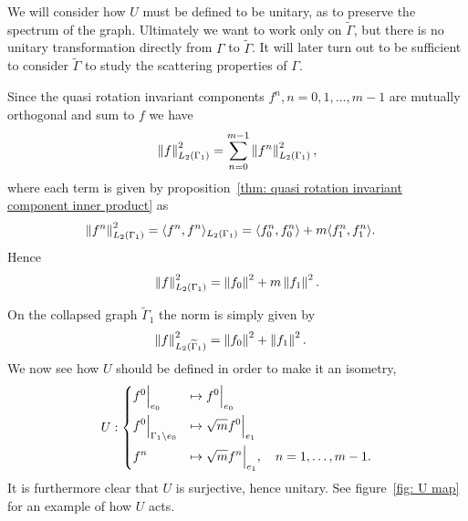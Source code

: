 We will consider how $U$ must be defined to be unitary, as to preserve the spectrum of the graph. Ultimately we want to work only on $\widetilde{\Gamma}$, but there is no unitary transformation directly from $\Gamma$ to $\widetilde{\Gamma}$. It will later turn out to be sufficient to consider $\widetilde{\Gamma}$ to study the scattering properties of $\Gamma$.

Since the quasi rotation invariant components $f^n, n = 0, 1, \ldots, m-1$ are mutually orthogonal and sum to $f$ we have
\[
  \left\lVert f\right\rVert_{L_2(\Gamma_1)}^2 = \sum_{n=0}^{m-1} \left\lVert f^n\right\rVert_{L_2(\Gamma_1)}^2,
\]
where each term is given by proposition~\ref{thm: quasi rotation invariant component inner product} as
\begin{align*}
  \left\lVert f^n\right\rVert_{L_2(\Gamma_1)}^2 &=
  \langle f^n, f^n \rangle_{L_2(\Gamma_1)} =
  \langle f^n_0, f^n_0 \rangle + m\langle f^n_1, f^n_1 \rangle.
\end{align*}
Hence
\[
  \left\lVert f\right\rVert_{L_2(\Gamma_1)}^2 = \left\lVert f_0\right\rVert^2 + m\left\lVert f_1\right\rVert^2.
\]

On the collapsed graph $\widetilde{\Gamma}_1$ the norm is simply given by
\begin{align*}
  \left\lVert f\right\rVert_{L_2(\widetilde{\Gamma}_1)}^2 &=
  \left\lVert f_0\right\rVert^2 + \left\lVert f_1\right\rVert^2.
\end{align*}
We now see how $U$ should be defined in order to make it an isometry,
\begin{equation*}
  U :
  \begin{dcases}
    f^0\Big|_{e_0} &\mapsto f^0\Big|_{e_0} \\
    f^0\Big|_{\Gamma_1\setminus e_0} &\mapsto \sqrt{m} f^0\Big|_{e_1} \\
    f^n &\mapsto \sqrt{m} f^n\Big|_{e_1}, \quad n = 1, \ldots, m - 1.
  \end{dcases}
\end{equation*}
It is furthermore clear that $U$ is surjective, hence unitary. See figure~\ref{fig: U map} for an example of how $U$ acts.

